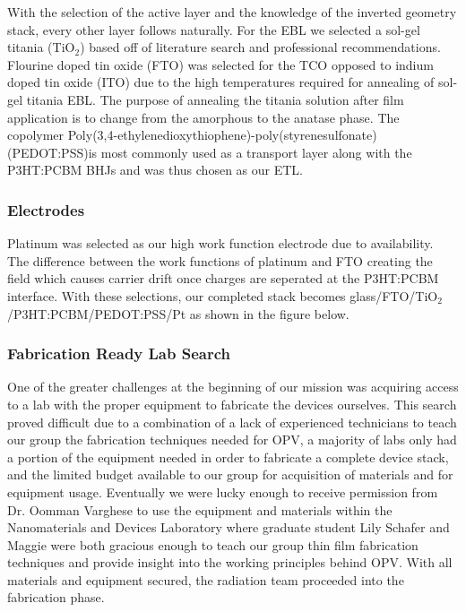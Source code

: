 	With the selection of the active layer and the knowledge of the inverted geometry stack, every other layer follows naturally. For the EBL we selected a sol-gel titania (TiO$_2$) based off of literature search and professional recommendations. Flourine doped tin oxide (FTO) was selected for the TCO opposed to indium doped tin oxide (ITO) due to the high temperatures required for annealing of sol-gel titania EBL. The purpose of annealing the titania solution after film application is to change from the amorphous to the anatase phase. The copolymer Poly(3,4-ethylenedioxythiophene)-poly(styrenesulfonate) (PEDOT:PSS)is most commonly used as a transport layer along with the P3HT:PCBM BHJs and was thus chosen as our ETL.
	
\subsubsection{Electrodes}
	
	Platinum was selected as our high work function electrode due to availability. The difference between the work functions of platinum and FTO creating the field which causes carrier drift once charges are seperated at the P3HT:PCBM interface. With these selections, our completed stack becomes \linebreak glass/FTO/TiO$_2$/P3HT:PCBM/PEDOT:PSS/Pt as shown in the figure below. \\
	
\subsubsection{Fabrication Ready Lab Search}
	
	One of the greater challenges at the beginning of our mission was acquiring access to a lab with the proper equipment to fabricate the devices ourselves. This search proved difficult due to a combination of a lack of experienced technicians to teach our group the fabrication techniques needed for OPV, a majority of labs only had a portion of the equipment needed in order to fabricate a complete device stack, and the limited budget available to our group for acquisition of materials and for equipment usage. Eventually we were lucky enough to receive permission from Dr. Oomman Varghese to use the equipment and materials within the Nanomaterials and Devices Laboratory where graduate student Lily Schafer and Maggie were both gracious enough to teach our group thin film fabrication techniques  and provide insight into the working principles behind OPV. With all materials and equipment secured, the radiation team proceeded into the fabrication phase. \\
